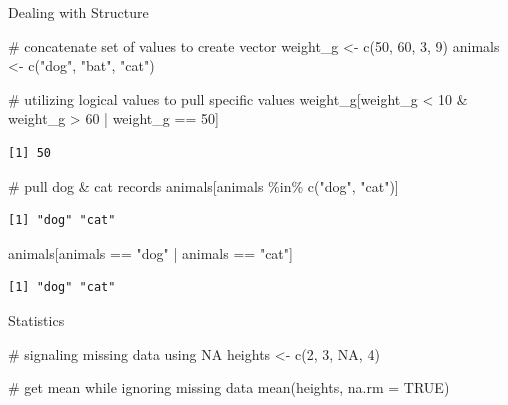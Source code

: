 \documentclass[
  letterpaper,
  DIV=11,
  numbers=noendperiod]{scrreprt}
\newenvironment{Shaded}{\begin{snugshade}}{\end{snugshade}}
\newcommand{\AttributeTok}[1]{\textcolor[rgb]{0.40,0.45,0.13}{#1}}
\newcommand{\CommentTok}[1]{\textcolor[rgb]{0.37,0.37,0.37}{#1}}
\newcommand{\ConstantTok}[1]{\textcolor[rgb]{0.56,0.35,0.01}{#1}}
\newcommand{\DecValTok}[1]{\textcolor[rgb]{0.68,0.00,0.00}{#1}}
\newcommand{\FunctionTok}[1]{\textcolor[rgb]{0.28,0.35,0.67}{#1}}
\newcommand{\NormalTok}[1]{\textcolor[rgb]{0.00,0.23,0.31}{#1}}
\newcommand{\OtherTok}[1]{\textcolor[rgb]{0.00,0.23,0.31}{#1}}
\newcommand{\SpecialCharTok}[1]{\textcolor[rgb]{0.37,0.37,0.37}{#1}}
\newcommand{\StringTok}[1]{\textcolor[rgb]{0.13,0.47,0.30}{#1}}
\begin{document}
Dealing with Structure

\begin{Shaded}
\begin{Highlighting}[]
\CommentTok{\# concatenate set of values to create vector}
\NormalTok{weight\_g }\OtherTok{\textless{}{-}} \FunctionTok{c}\NormalTok{(}\DecValTok{50}\NormalTok{, }\DecValTok{60}\NormalTok{, }\DecValTok{3}\NormalTok{, }\DecValTok{9}\NormalTok{)}
\NormalTok{animals }\OtherTok{\textless{}{-}} \FunctionTok{c}\NormalTok{(}\StringTok{"dog"}\NormalTok{, }\StringTok{"bat"}\NormalTok{, }\StringTok{"cat"}\NormalTok{)}

\CommentTok{\# utilizing logical values to pull specific values}
\NormalTok{weight\_g[weight\_g }\SpecialCharTok{\textless{}} \DecValTok{10} \SpecialCharTok{\&}\NormalTok{ weight\_g }\SpecialCharTok{\textgreater{}} \DecValTok{60} \SpecialCharTok{|}\NormalTok{ weight\_g }\SpecialCharTok{==} \DecValTok{50}\NormalTok{]}
\end{Highlighting}
\end{Shaded}

\begin{verbatim}
[1] 50
\end{verbatim}

\begin{Shaded}
\begin{Highlighting}[]
\CommentTok{\# pull dog \& cat records}
\NormalTok{animals[animals }\SpecialCharTok{\%in\%} \FunctionTok{c}\NormalTok{(}\StringTok{"dog"}\NormalTok{, }\StringTok{"cat"}\NormalTok{)]}
\end{Highlighting}
\end{Shaded}

\begin{verbatim}
[1] "dog" "cat"
\end{verbatim}

\begin{Shaded}
\begin{Highlighting}[]
\NormalTok{animals[animals }\SpecialCharTok{==} \StringTok{"dog"} \SpecialCharTok{|}\NormalTok{ animals }\SpecialCharTok{==} \StringTok{"cat"}\NormalTok{]}
\end{Highlighting}
\end{Shaded}

\begin{verbatim}
[1] "dog" "cat"
\end{verbatim}

Statistics

\begin{Shaded}
\begin{Highlighting}[]
\CommentTok{\# signaling missing data using NA}
\NormalTok{heights }\OtherTok{\textless{}{-}} \FunctionTok{c}\NormalTok{(}\DecValTok{2}\NormalTok{, }\DecValTok{3}\NormalTok{, }\ConstantTok{NA}\NormalTok{, }\DecValTok{4}\NormalTok{)}

\CommentTok{\# get mean while ignoring missing data}
\FunctionTok{mean}\NormalTok{(heights, }\AttributeTok{na.rm =} \ConstantTok{TRUE}\NormalTok{)}
\end{Highlighting}
\end{Shaded}
\end{document}

